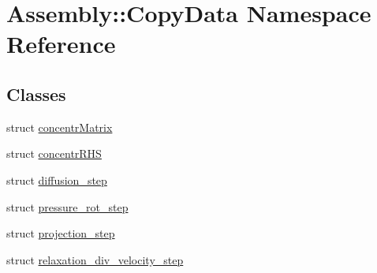 \hypertarget{namespace_assembly_1_1_copy_data}{}\section{Assembly\+:\+:Copy\+Data Namespace Reference}
\label{namespace_assembly_1_1_copy_data}
\subsection*{Classes}
\begin{DoxyCompactItemize}
\item 
struct \hyperlink{struct_assembly_1_1_copy_data_1_1concentr_matrix}{concentr\+Matrix}
\item 
struct \hyperlink{struct_assembly_1_1_copy_data_1_1concentr_r_h_s}{concentr\+R\+H\+S}
\item 
struct \hyperlink{struct_assembly_1_1_copy_data_1_1diffusion__step}{diffusion\+\_\+step}
\item 
struct \hyperlink{struct_assembly_1_1_copy_data_1_1pressure__rot__step}{pressure\+\_\+rot\+\_\+step}
\item 
struct \hyperlink{struct_assembly_1_1_copy_data_1_1projection__step}{projection\+\_\+step}
\item 
struct \hyperlink{struct_assembly_1_1_copy_data_1_1relaxation__div__velocity__step}{relaxation\+\_\+div\+\_\+velocity\+\_\+step}
\end{DoxyCompactItemize}
